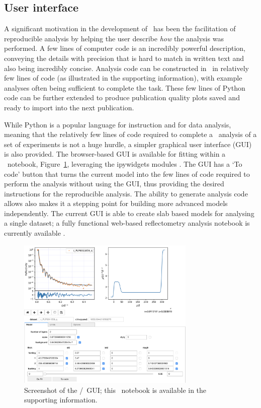 \documentclass[pdf,preprint]{iucr}
\begin{document}
\subsection{User interface}

A significant motivation in the development of \ has been the facilitation of reproducible analysis by helping the user describe \emph{how} the analysis was performed. A few lines of computer code is an incredibly powerful description, conveying the details with precision that is hard to match in written text and also being incredibly concise. Analysis code can be constructed in \ in relatively few lines of code (as illustrated in the supporting information), with example analyses often being sufficient to complete the task. These few lines of Python code can be further extended to produce publication quality plots saved and ready to import into the next publication.

While Python is a popular language for instruction and for data analysis, meaning that the relatively few lines of code required to complete a \ analysis of a set of experiments is not a huge hurdle, a simpler graphical user interface (GUI) is also provided.
The browser-based GUI is available for fitting within a \Jupyter\ notebook, Figure~\ref{fig:gui}, leveraging the ipywidgets modules \cite{ipywidgets}. The GUI has a `To code' button that turns the current model into the few lines of code required to perform the analysis without using the GUI, thus providing the desired instructions for the reproducible analysis. The ability to generate analysis code allows also makes it a stepping point for building more advanced models independently.
The current GUI is able to create slab based models for analysing a single dataset; a fully functional web-based reflectometry analysis notebook is currently available \cite{Nelson2018}.

\begin{figure}
  \includegraphics[width=85mm]{./supporting_information/gui.png}
  \caption{Screenshot of the \Jupyter/\ipywidgets\ GUI; this \Jupyter\ notebook is available in the supporting information.}
  \label{fig:gui}
\end{figure}
\end{document}
